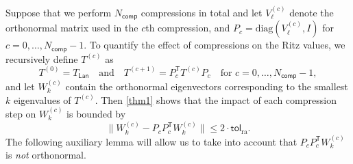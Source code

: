 \documentclass{siamart190516}
\newcommand{\Ttran}{\mathsf{T}}
\newcommand{\tol}{\mathsf{tol}}
\newcommand{\lan}{\mathsf{Lan}}
\newcommand{\compress}{N_\mathsf{comp}}
\providecommand{\diagM}[1]{\mathrm{diag}(#1)}
\providecommand{\norm}[1]{\lVert#1\rVert}
\begin{document}
Suppose that we perform $\compress$ compressions in total and let $V^{(c)}_{\ell}$ denote the orthonormal matrix used in the $c$th compression, and $P_{c}=\diagM{V^{(c)}_{\ell},I}$ for $c=0,\dotsc,\compress-1$. To quantify the effect of compressions on the Ritz values, we recursively define $T^{(c)}$ as
\begin{equation}
    \label{eq:defT^}
    T^{(0)}=T_{\lan} \quad\text{and}\quad  T^{(c+1)} = P_{c}^{\Ttran}T^{(c)}P_{c}\quad \text{for }c=0,\dotsc,\compress-1,
\end{equation}
and let $W_{k}^{(c)}$ contain the orthonormal eigenvectors corresponding to the smallest $k$ eigenvalues of $T^{(c)}$. Then \cref{thm1} shows that the impact of each compression step on $W_{k}^{(c)}$ is bounded by
\begin{equation}
    \label{eq:normWkj}
    \norm{W_{k}^{(c)}-P_{c}P_{c}^{\Ttran}W_{k}^{(c)}} \leq 2 \cdot \tol_{\mathrm{ra}}.
\end{equation}
The following auxiliary lemma will allow us to take into account that $P_{c}P_{c}^{\Ttran}W_{k}^{(c)}$ is \emph{not} orthonormal.
\end{document}

